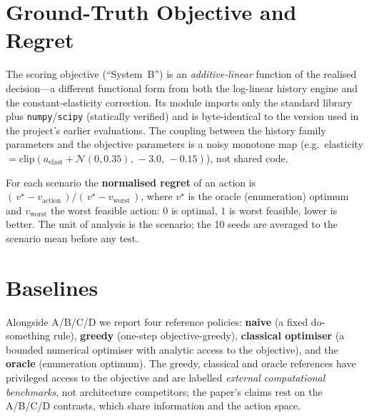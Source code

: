 \documentclass[10pt,twocolumn,a4paper]{article}
\newcommand{\code}[1]{\texttt{#1}}
\begin{document}
\section{Ground-Truth Objective and Regret}\label{sec:gt}
The scoring objective (``System~B'') is an \emph{additive-linear} function of the
realised decision---a different functional form from both the log-linear history
engine and the constant-elasticity correction. Its module imports only the
standard library plus \code{numpy}/\code{scipy} (statically verified) and is
byte-identical to the version used in the project's earlier evaluations. The
coupling between the history family parameters and the objective parameters is a
noisy monotone map (e.g.\ elasticity
$=\mathrm{clip}(a_{\mathrm{elast}}+\mathcal{N}(0,0.35),\,-3.0,\,-0.15)$), not
shared code.

For each scenario the \textbf{normalised regret} of an action is
$(\,v^\star - v_{\mathrm{action}}\,)/(\,v^\star - v_{\mathrm{worst}}\,)$, where
$v^\star$ is the oracle (enumeration) optimum and $v_{\mathrm{worst}}$ the worst
feasible action: $0$ is optimal, $1$ is worst feasible, lower is better. The
unit of analysis is the scenario; the 10 seeds are averaged to the scenario mean
before any test.

\section{Baselines}\label{sec:baselines}
Alongside A/B/C/D we report four reference policies: \textbf{naive} (a fixed
do-something rule), \textbf{greedy} (one-step objective-greedy),
\textbf{classical optimiser} (a bounded numerical optimiser with analytic access
to the objective), and the \textbf{oracle} (enumeration optimum). The greedy,
classical and oracle references have privileged access to the objective and are
labelled \emph{external computational benchmarks}, not architecture competitors;
the paper's claims rest on the A/B/C/D contrasts, which share information and the
action space.

\end{document}
